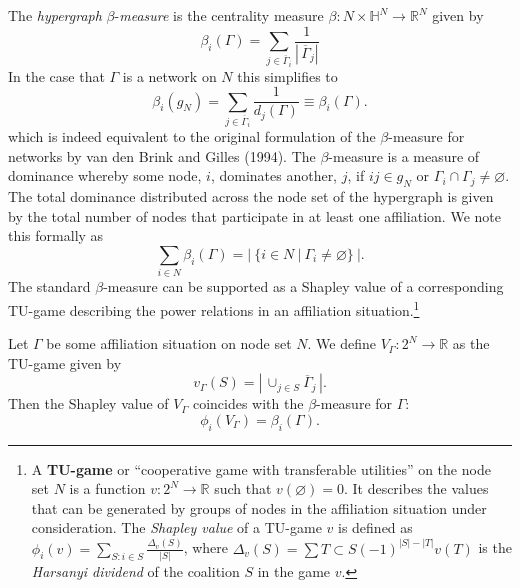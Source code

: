 The \emph{hypergraph} $\beta$-\emph{measure} is the centrality measure $\beta \colon N \times \mathbb{H}^N \to \mathbb{R}^N$ given by
\begin{equation}
\beta_i (\Gamma ) = \sum_{j \in \overline{\Gamma}_i} \frac{1}{\left| \, \overline{\Gamma}_j \right|}
\end{equation}
In the case that $\Gamma$ is a network on $N$ this simplifies to
\begin{equation}
\beta_i (g_{N}) = \sum_{j \in \overline{\Gamma}_i} \frac{1}{d_j (\Gamma )} \equiv \beta_i (\Gamma ) .
\end{equation}
which is indeed equivalent to the original formulation of the $\beta$-measure for networks by van den Brink and Gilles (1994). The $\beta$-measure is a measure of dominance whereby some node, $i$, dominates another, $j$, if $ij \in g_{N}$ or $\Gamma_{i} \cap \Gamma_{j} \neq \varnothing$. The total dominance distributed across the node set of the hypergraph is given by the total number of nodes that participate in at least one affiliation. We note this formally as
\begin{equation}
\sum_{i \in N} \beta_{i}(\Gamma) = | ~ \{ i \in N ~ | ~ \Gamma_{i} \neq \varnothing \} ~ | .
\end{equation}
The standard $\beta$-measure can be supported as a Shapley value of a corresponding TU-game describing the power relations in an affiliation situation.\footnote{A \textbf{TU-game} or ``cooperative game with transferable utilities'' on the node set $N$ is a function $v \colon 2^N \to \mathbb{R}$ such that $v( \varnothing )=0$. It describes the values that can be generated by groups of nodes in the affiliation situation under consideration. The \emph{Shapley value} of a TU-game $v$ is defined as $\phi_i (v) = \sum_{S \colon i \in S} \frac{\Delta_v (S)}{|S|}$, where $\Delta_v (S) = \sum{T \subset S} (-1)^{|S|-|T|} v(T)$ is the \emph{Harsanyi dividend} of the coalition $S$ in the game $v$.}
\begin{theorem}
Let $\Gamma$ be some affiliation situation on node set $N$. We define $V_{\Gamma} \colon 2^N \to \mathbb{R}$ as the TU-game given by
\begin{equation}
v_{\Gamma} (S) = \left| \, \cup_{j \in S} \overline{\Gamma}_j \, \right| .
\end{equation}
Then the Shapley value of $V_{\Gamma}$ coincides with the $\beta$-measure for $\Gamma \colon$
\begin{equation}
\phi_i \left( V_{\Gamma} \right) = \beta_i (\Gamma ) .
\end{equation}
\end{theorem}
